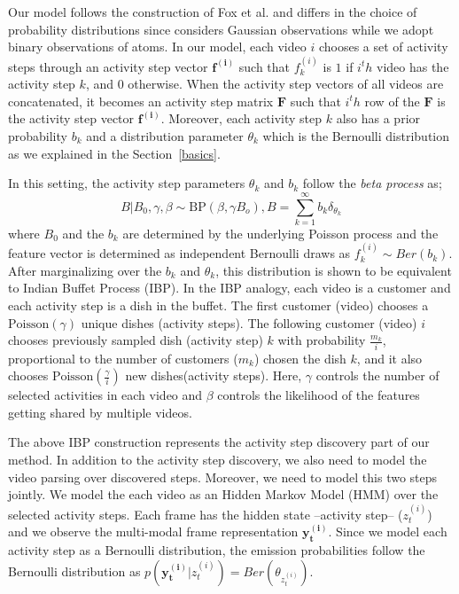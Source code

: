 Our model follows the construction of Fox et al.\cite{foxBPHMM} and differs in the choice of probability distributions since \cite{foxBPHMM} considers Gaussian observations while we adopt binary observations of atoms. In our model, each video $i$ chooses a set of activity steps through an activity step vector $\mathbf{f^{(i)}}$ such that $f^{(i)}_k$ is $1$ if $i^th$ video has the activity step $k$, and 0 otherwise. When the activity step vectors of all videos are concatenated, it becomes an activity step matrix $\mathbf{F}$ such that $i^th$ row of the $\mathbf{F}$ is the activity step vector $\mathbf{f^{(i)}}$. Moreover, each activity step $k$ also has a prior probability $b_k$  and a distribution parameter $\theta_k$ which is the Bernoulli distribution as we explained in the Section~\ref{basics}. 

In this setting, the activity step parameters $\theta_k$ and $b_k$ follow the \emph{beta process} as;
\begin{equation}
  B|B_0,\gamma,\beta \sim \text{BP}(\beta,\gamma B_o), B=\sum_{k=1}^\infty b_k \delta_{\theta_k}
\end{equation}
where $B_0$ and the $b_k$ are determined by the underlying Poisson process \cite{ibp} and the feature vector is determined as independent Bernoulli draws as $f_{k}^{(i)} \sim Ber(b_k)$. After marginalizing over the $b_k$ and $\theta_k$, this distribution is shown to be equivalent to Indian Buffet Process (IBP)\cite{ibp}. In the IBP analogy, each video is a customer and each activity step is a dish in the buffet. The first customer (video) chooses a $\text{Poisson}(\gamma)$ unique dishes (activity steps). The following customer (video) $i$ chooses previously sampled dish (activity step) $k$ with probability $\frac{m_k}{i}$,  proportional to the number of customers ($m_k$) chosen the dish $k$, and it also chooses $\text{Poisson}(\frac{\gamma}{i})$ new dishes(activity steps). Here, $\gamma$ controls the number of selected activities in each video and $\beta$ controls the likelihood of the features getting shared by multiple videos.

The above IBP construction represents the activity step discovery part of our method. In addition to the activity step discovery, we also need to model the video parsing over discovered steps. Moreover, we need to model this two steps jointly. We model the each video as an Hidden Markov Model (HMM) over the selected activity steps. Each frame has the hidden state --activity step-- ($z^{(i)}_t$) and we observe the multi-modal frame representation $\mathbf{y^{(i)}_t}$. Since we model each activity step as a Bernoulli distribution, the emission probabilities follow the Bernoulli distribution as $p(\mathbf{y^{(i)}_t}|z^{(i)}_t)=Ber(\theta_{z^{(i)}_t})$.

